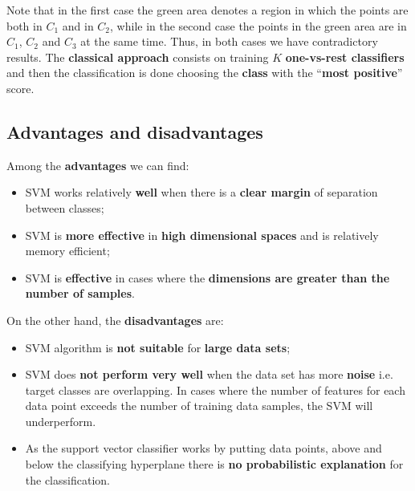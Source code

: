 Note that in the first case the green area denotes a region in which the points are both in $C_1$ and in $C_2$, while in the second case the points in the green area are in $C_1$, $C_2$ and $C_3$ at the same time. Thus, in both cases we have contradictory results. The \textbf{classical approach} consists on training $K$ \textbf{one-vs-rest classifiers} and then the classification is done choosing the \textbf{class} with the ``\textbf{most positive}'' score.


\subsection{Advantages and disadvantages}
Among the \textbf{advantages} we can find:

\begin{itemize}
    \item SVM works relatively \textbf{well} when there is a \textbf{clear margin} of separation between classes;
    \item SVM is\textbf{ more effective} in \textbf{high dimensional spaces} and is relatively memory efficient;
    \item SVM is \textbf{effective} in cases where the \textbf{dimensions are greater than the number of samples}.
\end{itemize}

On the other hand, the \textbf{disadvantages} are:

\begin{itemize}
    \item SVM algorithm is \textbf{not suitable} for \textbf{large data sets};
    \item SVM does \textbf{not perform very well} when the data set has more \textbf{noise} i.e. target classes are overlapping. In cases where the number of features for each data point exceeds the number of training data samples, the SVM will underperform.
    \item As the support vector classifier works by putting data points, above and below the classifying hyperplane there is \textbf{no probabilistic explanation} for the classification.
\end{itemize}